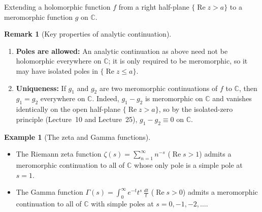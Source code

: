 \documentclass[11pt]{article}
\theoremstyle{plain}
\theoremstyle{definition}
\newtheorem{example}[theorem]{Example}
\theoremstyle{boldremark}
\newtheorem*{remark}{Remark}
\theoremstyle{remark}
\numberwithin{equation}{section}
\newcommand{\C}{\mathbb{C}}
\DeclareMathOperator{\Real}{Re}
\DeclareMathOperator{\Imag}{Im}
\newenvironment{lecturefigure}
 {\par\addvspace{0.25em}\begingroup\setlength{\parskip}{0pt}\centering}
 {\par\endgroup\addvspace{0.25em}}
\begin{document}
\begin{lecturefigure}
\begin{minipage}{\linewidth}\centering
{}

\vspace{0.15em}
{\small Extending a holomorphic function $f$ from a right half-plane
$\{\Real z > a\}$ to a meromorphic function $g$ on $\C$.}
\end{minipage}
\end{lecturefigure}

\begin{remark}[Key properties of analytic continuation]
\leavevmode
\begin{enumerate}[label=\textup{(\arabic*)}]
 \item \textbf{Poles are allowed:} An analytic continuation as above need
       not be holomorphic everywhere on $\C$; it is only required to be
       meromorphic, so it may have isolated poles in $\{\Real z \leq a\}$.
 \item \textbf{Uniqueness:} If $g_1$ and $g_2$ are two meromorphic
       continuations of $f$ to $\C$, then $g_1=g_2$ everywhere on $\C$.
       Indeed, $g_1-g_2$ is meromorphic on $\C$ and vanishes identically on
       the open half-plane $\{\Real z > a\}$, so by the isolated-zero
       principle (Lecture~10 and Lecture~25), $g_1-g_2\equiv 0$ on $\C$.
\end{enumerate}
\end{remark}

\begin{example}[The zeta and Gamma functions]
\leavevmode
\begin{itemize}
 \item The Riemann zeta function $\zeta(s)=\sum_{n=1}^{\infty} n^{-s}$
       ($\Real s > 1$) admits a meromorphic continuation to all of $\C$
       whose only pole is a simple pole at $s=1$.
 \item The Gamma function $\Gamma(s)=\int_0^{\infty} e^{-t}t^s\,\frac{dt}{t}$
       ($\Real s > 0$) admits a meromorphic continuation to all of $\C$
       with simple poles at $s=0,-1,-2,\dots$.
\end{itemize}
\end{example}
\end{document}
